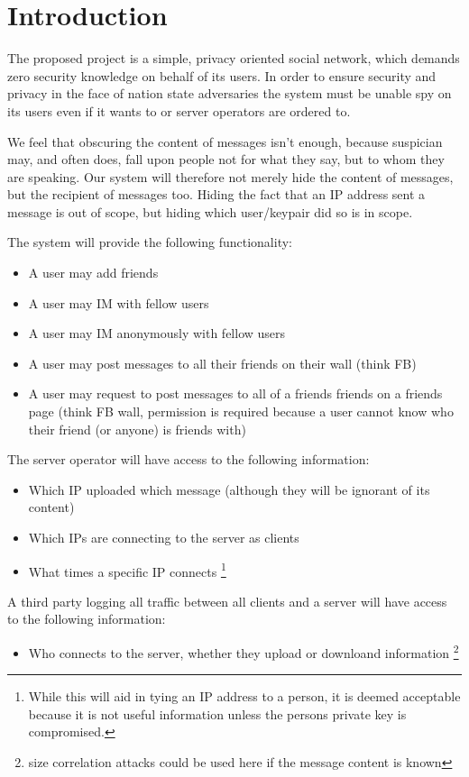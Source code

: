 \chapter{Introduction}
The proposed project is a simple, privacy oriented social network, which demands
zero security knowledge on behalf of its users. In order to ensure security and
privacy in the face of nation state adversaries the system must be unable spy on
its users even if it wants to or server operators are ordered to.

We feel that obscuring the content of messages isn't enough, because suspician
may, and often does, fall upon people not for what they say, but to whom they
are speaking. Our system will therefore not merely hide
the content of messages, but the recipient of messages too. Hiding the fact that
an IP address sent a message is out of scope, but hiding which user/keypair did
so is in scope.

The system will provide the following functionality:
\begin{itemize}
\item A user may add friends
\item A user may IM with fellow users
\item A user may IM anonymously with fellow users
\item A user may post messages to all their friends on their wall (think FB)
\item A user may request to post messages to all of a friends friends on a
friends page (think FB wall, permission is required because a user cannot know
who their friend (or anyone) is friends with)
\end{itemize}

The server operator will have access to the following information:
\begin{itemize}
\item Which IP uploaded which message (although they will be ignorant of its
content)
\item Which IPs are connecting to the server as clients
\item What times a specific IP connects \footnote {While this will aid in tying
an IP address to a person, it is deemed acceptable because it is not useful
information unless the persons private key is compromised.}
\end{itemize}

A third party logging all traffic between all clients and a server will have
access to the following information: 
\begin{itemize}
\item Who connects to the server, whether they upload or downloand information
\footnote{size correlation attacks could be used here if the message content is
known}
\end{itemize}

